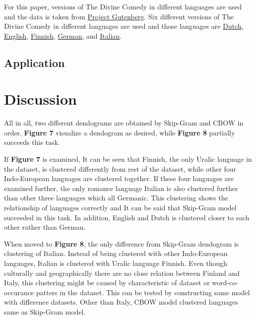 \documentclass[man]{apa7}
\begin{document}
For this paper, versions of The Divine Comedy in different languages are used and the data is taken from \href{https://www.gutenberg.org/}{Project Gutenberg}. Six different versions of The Divine Comedy in different languages are used and those languages are \href{https://www.gutenberg.org/cache/epub/39181/pg39181-images.html}{Dutch}, \href{https://www.gutenberg.org/cache/epub/1004/pg1004-images.html}{English}, \href{https://www.gutenberg.org/cache/epub/12546/pg12546.html}{Finnish}, \href{https://www.gutenberg.org/cache/epub/8085/pg8085.html}{German}, and \href{https://www.gutenberg.org/cache/epub/1000/pg1000-images.html}{Italian}.

\subsection{Application}



\section{Discussion}
All in all, two different dendograms are obtained by Skip-Gram and CBOW in order. \textbf{Figure 7} visualize a dendogram as desired, while \textbf{Figure 8} partially succeeds this task.

If \textbf{Figure 7} is examined, It can be seen that Finnish, the only Uralic language in the dataset, is clustered differently from rest of the dataset, while other four Indo-European languages are clustered together. If these four languages are examined further, the only romance language Italian is also clustered further than other three languages which all Germanic. This clustering shows the relationship of languages correctly and It can be said that Skip-Gram model succeeded in this task. In addition, English and Dutch is clustered closer to each other rather than German.

When moved to \textbf{Figure 8}, the only difference from Skip-Gram dendogram is clustering of Italian. Instead of being clustered with other Indo-European languages, Italian is clustered with Uralic language Finnish. Even though culturally and geographically there are no close relation between Finland and Italy, this clustering might be caused by characteristic of dataset or word-co-occurance patters in the dataset. This can be tested by constructing same model with difference datasets. Other than Italy, CBOW model clustered languages same as Skip-Gram model.
\end{document}
